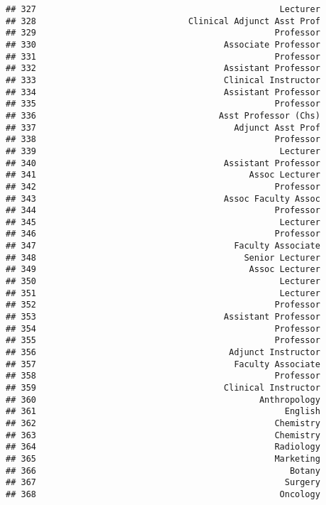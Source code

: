 \documentclass[
]{article}
\begin{document}
\begin{verbatim}
## 327                                                Lecturer
## 328                              Clinical Adjunct Asst Prof
## 329                                               Professor
## 330                                     Associate Professor
## 331                                               Professor
## 332                                     Assistant Professor
## 333                                     Clinical Instructor
## 334                                     Assistant Professor
## 335                                               Professor
## 336                                    Asst Professor (Chs)
## 337                                       Adjunct Asst Prof
## 338                                               Professor
## 339                                                Lecturer
## 340                                     Assistant Professor
## 341                                          Assoc Lecturer
## 342                                               Professor
## 343                                     Assoc Faculty Assoc
## 344                                               Professor
## 345                                                Lecturer
## 346                                               Professor
## 347                                       Faculty Associate
## 348                                         Senior Lecturer
## 349                                          Assoc Lecturer
## 350                                                Lecturer
## 351                                                Lecturer
## 352                                               Professor
## 353                                     Assistant Professor
## 354                                               Professor
## 355                                               Professor
## 356                                      Adjunct Instructor
## 357                                       Faculty Associate
## 358                                               Professor
## 359                                     Clinical Instructor
## 360                                            Anthropology
## 361                                                 English
## 362                                               Chemistry
## 363                                               Chemistry
## 364                                               Radiology
## 365                                               Marketing
## 366                                                  Botany
## 367                                                 Surgery
## 368                                                Oncology

\end{verbatim}
\end{document}

